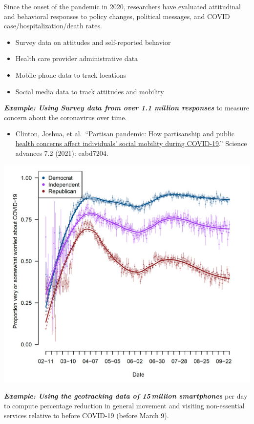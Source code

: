 \documentclass[
  letterpaper,
  DIV=11,
  numbers=noendperiod]{scrreprt}
\providecommand{\tightlist}{%
  \setlength{\itemsep}{0pt}\setlength{\parskip}{0pt}}\usepackage{longtable,booktabs,array}
\begin{document}
Since the onset of the pandemic in 2020, researchers have evaluated
attitudinal and behavioral responses to policy changes, political
messages, and COVID case/hospitalization/death rates.

\begin{itemize}
\tightlist
\item
  Survey data on attitudes and self-reported behavior
\item
  Health care provider administrative data
\item
  Mobile phone data to track locations
\item
  Social media data to track attitudes and mobility
\end{itemize}

\textbf{\emph{Example: Using Survey data from over 1.1 million
responses}} to measure concern about the coronavirus over time.

\begin{itemize}
\tightlist
\item
  Clinton, Joshua, et
  al.~``\href{https://www.science.org/doi/10.1126/sciadv.abd7204}{Partisan
  pandemic: How partisanship and public health concerns affect
  individuals' social mobility during COVID-19}.'' Science advances 7.2
  (2021): eabd7204.
\end{itemize}

\includegraphics{images/covidsurvey.png}

\textbf{\emph{Example: Using the geotracking data of 15 million
smartphones}} per day to compute percentage reduction in general
movement and visiting non-essential services relative to before COVID-19
(before March 9).
\end{document}
